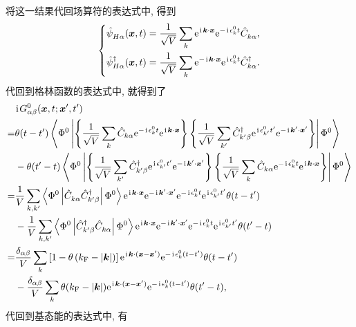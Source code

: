 将这一结果代回场算符的表达式中, 得到
\begin{equation}
    \left\{ \begin{aligned}
        &\hat\psi_{H\alpha}^{ }(\vct{x},t)=\frac{1}{\sqrt{V}}\sum_k\e^{\ii\vct{k}\cdot\vct{x}}\e^{-\ii\epsilon_k^0 t}\hat{C}_{k\alpha}^{ },\\
        &\hat{\psi}^\dg_{H\alpha}(\vct{x},t)=\frac{1}{\sqrt{V}}\sum_k\e^{-\ii\vct{k}\cdot\vct{x}}\e^{\ii\epsilon_k^0t}\hat{C}_{k\alpha}^\dg.
    \end{aligned}\right.
\end{equation}
代回到格林函数的表达式中, 就得到了
 \begin{align}\label{freegreenfuc}
        &\ii G_{\alpha\beta}^{0}(\vct{x},t;\vct{x}',t')\nonumber\\
        =&\theta(t-t')\llag\Phi^0\lk\lb\frac{1}{\sqrt{V}}\sum_{k}\hat{C}_{k\alpha}\e^{-\ii\epsilon_k^0t}\e^{\ii\vct{k}\cdot\vct{x}}\rb\lb \frac{1}{\sqrt{V}}\sum_{k'}\hat{C}_{k'\beta}^\dg\e^{\ii\epsilon_{k'}^0t'}\e^{-\ii\vct{k}'\cdot\vct{x}'} \rb\rk\Phi^0\rrag\nonumber\\
        &-\theta(t'-t)\llag\Phi^0\lk\lb \frac{1}{\sqrt{V}}\sum_{k'}\hat{C}^\dg_{k'\beta}\e^{\ii\epsilon_{k'}^0t'}\e^{-\ii\vct{k}'\cdot\vct{x}'} \rb\lb\frac{1}{\sqrt{V}}\sum_{k}\hat{C}_{k\alpha}\e^{-\ii\epsilon_k^0t}\e^{\ii\vct{k}\cdot\vct{x}}\rb\rk\Phi^0\rrag\nonumber\\
        =&\frac{1}{V}\sum_{k,k'}\llag\Phi^0\lk\hat{C}_{k\alpha}^{ }\hat{C}_{k'\beta}^\dg \rk\Phi^0\rrag\e^{\ii\vct{k}\cdot\vct{x}}\e^{-\ii\vct{k}'\cdot\vct{x}'}\e^{-\ii\epsilon_k^0 t}\e^{\ii\epsilon_{k'}^0t'}\theta(t-t')\nonumber\\
        &-\frac{1}{V}\sum_{k,k'}\llag\Phi^0\lk\hat{C}_{k'\beta}^{\dg }\hat{C}_{k\alpha}^{ } \rk\Phi^0\rrag\e^{\ii\vct{k}\cdot\vct{x}}\e^{-\ii\vct{k}'\cdot\vct{x}'}\e^{-\ii\epsilon_k^0 t}\e^{\ii\epsilon_{k'}^0t'}\theta(t'-t)\nonumber\\
        =&\frac{\delta_{\alpha\beta}}{V}\sum_k\lmi 1-\theta\ls k_{\fun{F}}-|\vct{k}| \rs \rmi \e^{\ii\vct{k}\cdot(\vct{x}-\vct{x}')}\e^{-\ii\epsilon_k^0(t-t')}\theta(t-t')\nonumber\\
        &-\frac{\delta_{\alpha\beta}}{V}\sum_k\theta(k_{\fun{F}}-|\vct{k}|) \e^{\ii\vct{k}\cdot(\vct{x}-\vct{x}')}\e^{-\ii\epsilon_k^0(t-t')}\theta(t'-t),
    \end{align}
代回到基态能的表达式中, 有
